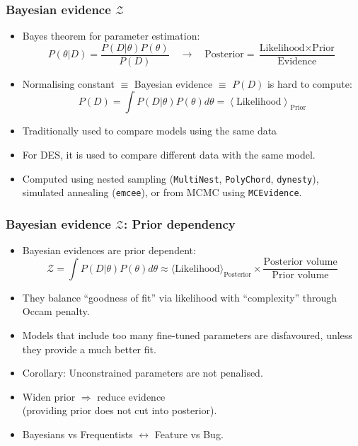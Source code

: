 \documentclass[%
]{beamer}
\begin{document}
\begin{frame}
    \frametitle{Bayesian evidence $\mathcal{Z}$}
    \begin{itemize}
        \item Bayes theorem for parameter estimation:
    \[
    P(\theta|D) = \frac{P(D|\theta)P(\theta)}{P(D)} \quad\longrightarrow\quad \text{Posterior} = \frac{\text{Likelihood}\times\text{Prior}}{\text{Evidence}}
    \]
        \item Normalising constant $\equiv$ Bayesian evidence $\equiv$ $P(D)$ is hard to compute:
    \[
        P(D) = \int P(D|\theta)P(\theta) d\theta = \left\langle \text{Likelihood} \right\rangle_\text{Prior}
    \]
        \item Traditionally used to compare models using the same data
        \item For DES, it is used to compare different data with the same model.
        \item Computed using nested sampling (\texttt{MultiNest}, \texttt{PolyChord}, \texttt{dynesty}), simulated annealing (\texttt{emcee}), or from MCMC using \texttt{MCEvidence}.
    \end{itemize}
\end{frame}

\begin{frame}
    \frametitle{Bayesian evidence $\mathcal{Z}$: Prior dependency}
    \begin{itemize}
        \item Bayesian evidences are prior dependent:
            \[
                \mathcal{Z} = \int P(D|\theta)P(\theta) d\theta \approx \langle\text{Likelihood}\rangle_\text{Posterior} \times \frac{\text{Posterior volume}}{\text{Prior volume}}
            \]
        \item They balance ``goodness of fit'' via likelihood with ``complexity'' through Occam penalty.
        \item Models that include too many fine-tuned parameters are disfavoured, unless they provide a much better fit.
        \item Corollary: Unconstrained parameters are not penalised.
        \item Widen prior $\Rightarrow$ reduce evidence \\ (providing prior does not cut into posterior).
        \item Bayesians vs Frequentists $\leftrightarrow$ Feature vs Bug.
    \end{itemize}
\end{frame}
\end{document}
